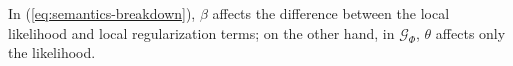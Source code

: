 \documentclass{article}
\theoremstyle{plain}
\theoremstyle{definition}
\theoremstyle{remark}
\numberwithin{equation}{section}
\begin{document}
In (\ref{eq:semantics-breakdown}), 
$\beta$ affects the difference between the local likelihood and
local regularization terms; on the other hand, in $\mathcal G_\Phi$,
$\theta$ affects only the likelihood.
\end{document}
